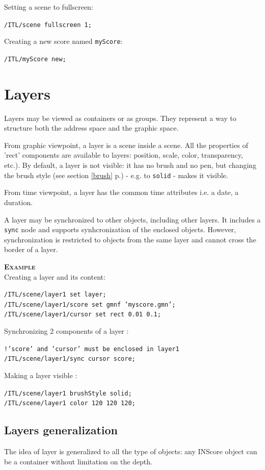 \documentclass[a4paper,twoside]{report}
\newcommand{\toplevel}[1]	{\chapter{#1}}
\newcommand{\sublevel}[1]	{\section{#1}}
\newcommand{\fullref}[1]	{\ref{#1} p.\pageref{#1}}
\newcommand{\OSC}[1]		{\texttt{#1}}
\newcommand{\example}		{\textbf{\hspace{-1.5cm}\textbf{\textsc{Example }}}}
\newcommand{\sample}	[1]			{\vspace{-2mm}\begin{center}\colorbox{mygrey}{
								\begin{minipage}[t]{0.9\columnwidth} 
								{\small \texttt{#1}}
								\end{minipage}}\end{center}}
\begin{document}
Setting a scene to fullscreen:
\sample{/ITL/scene fullscreen 1;}
Creating a new score named \OSC{myScore}:
\sample{/ITL/myScore new;}


\toplevel{Layers}
\label{layers}

Layers may be viewed as containers or as groups. They represent a way to structure both the address space and the graphic space. 

From graphic viewpoint, a layer is a scene inside a scene. All the properties of 'rect' components are available to layers: position, scale, color, transparency, etc.). By default, a layer is not visible: it has no brush and no pen, but changing the brush style (see section \fullref{brush}) - e.g. to \OSC{solid} - makes it visible.

From time viewpoint, a layer has the common time attributes i.e. a date, a duration.

A layer may be synchronized to other objects, including other layers. It includes a \OSC{sync} node and supports synhcronization of the enclosed objects. However, synchronization is restricted to objects from the same layer and cannot cross the border of a layer. 


\example \\
Creating a layer and its content:
\sample{/ITL/scene/layer1 set layer;\\
/ITL/scene/layer1/score set gmnf 'myscore.gmn';\\
/ITL/scene/layer1/cursor set rect 0.01 0.1;}

Synchronizing 2 components of a layer :
\sample{!'score' and 'cursor' must be enclosed in layer1 \\
/ITL/scene/layer1/sync cursor score; 
}

Making a layer visible :
\sample{/ITL/scene/layer1 brushStyle solid; \\
/ITL/scene/layer1 color 120 120 120; 
}

\sublevel{Layers generalization}
\label{layersgen}

The idea of layer is generalized to all the type of objects: any INScore object can be a container without limitation on the depth.


%
\end{document}
